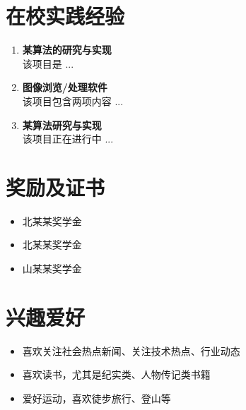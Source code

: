 ﻿\documentclass[[a4paper,12pt]{article}
\begin{document}
\section{在校实践经验}
\begin{enumerate}
\item \textbf{\bfseries\sffamily 某算法的研究与实现} \\
该项目是 ...

\item \textbf{\bfseries\sffamily 图像浏览/处理软件} \\
该项目包含两项内容 ... 

\item \textbf{\bfseries\sffamily 某算法研究与实现} \\
该项目正在进行中 ...

\end{enumerate}
\vspace{-2em}

\section{奖励及证书}
\begin{itemize}
\setlength{\itemsep}{0pt}
\item 北某某奖学金 \par
\item 北某某奖学金 \par
\item 山某某奖学金 \par
\end{itemize}
\vspace{-2em}

\section{兴趣爱好}

\begin{itemize}
\setlength{\itemsep}{0pt}
\item 喜欢关注社会热点新闻、关注技术热点、行业动态 \par
\item 喜欢读书，尤其是纪实类、人物传记类书籍 \par
\item 爱好运动，喜欢徒步旅行、登山等 \par
\end{itemize}
\end{document}
